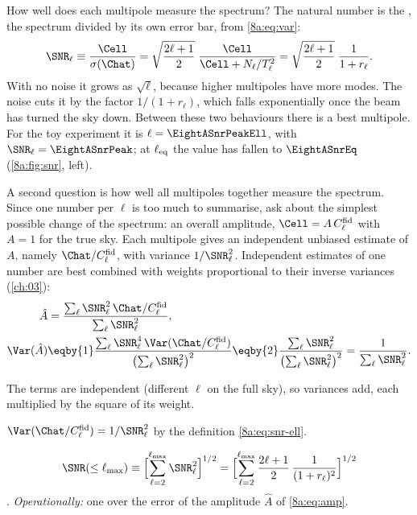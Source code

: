 How well does each multipole measure the spectrum? The natural number is the
, the spectrum divided by its own error bar, from
\eqref{8a:eq:var}:
\begin{equation}
  \SNR_\ell\equiv\frac{\Cell}{\sigma(\Chat)}=\sqrt{\frac{2\ell+1}{2}}\;\frac{\Cell}{\Cell+N_\ell/T_\ell^2}
  =\sqrt{\frac{2\ell+1}{2}}\;\frac{1}{1+r_\ell}.
  \label{8a:eq:snr-ell}
\end{equation}
With no noise it grows as $\sqrt{\ell}$, because higher multipoles have more modes. The noise
cuts it by the factor $1/(1+r_\ell)$, which falls exponentially once the beam has turned the
sky down. Between these two behaviours there is a best multipole. For the toy experiment it is
$\ell=\EightASnrPeakEll$, with $\SNR_\ell=\EightASnrPeak$; at $\ell_{\rm eq}$ the value has fallen
to $\EightASnrEq$ (\cref{8a:fig:snr}, left).

A second question is how well all multipoles together measure the spectrum. Since one
number per $\ell$ is too much to summarise, ask about the simplest possible change of the
spectrum: an overall amplitude, $\Cell=A\,C^{\rm fid}_\ell$ with $A=1$ for the true sky. Each
multipole gives an independent unbiased estimate of $A$, namely $\Chat/C^{\rm fid}_\ell$, with
variance $1/\SNR_\ell^2$. Independent estimates of one number are best combined with weights
proportional to their inverse variances (\cref{ch:03}):
\begin{align}
  \hat A&=\frac{\sum_\ell\SNR_\ell^2\,\Chat/C^{\rm fid}_\ell}{\sum_\ell\SNR_\ell^2},
  \nonumber\\
  \Var(\hat A)
  &\eqby{1}\frac{\sum_\ell\SNR_\ell^4\,\Var(\Chat/C^{\rm fid}_\ell)}{\bigl(\sum_\ell\SNR_\ell^2\bigr)^2}
   \eqby{2}\frac{\sum_\ell\SNR_\ell^2}{\bigl(\sum_\ell\SNR_\ell^2\bigr)^2}
   =\frac{1}{\sum_\ell\SNR_\ell^2} .
  \label{8a:eq:amp}
\end{align}
\begin{explain}
  \item The terms are independent (different $\ell$ on the full sky), so variances add, each
        multiplied by the square of its weight.
  \item $\Var(\Chat/C^{\rm fid}_\ell)=1/\SNR_\ell^2$ by the definition \eqref{8a:eq:snr-ell}.
\end{explain}

\begin{workdef}
\[
  \SNR(\le\ell_{\max})\equiv\Bigl[\sum_{\ell=2}^{\ell_{\max}}\SNR_\ell^2\Bigr]^{1/2}
  =\Bigl[\sum_{\ell=2}^{\ell_{\max}}\frac{2\ell+1}{2}\,\frac{1}{(1+r_\ell)^2}\Bigr]^{1/2}
\]
. \emph{Operationally:} one over the error
of the amplitude $\hat A$ of \eqref{8a:eq:amp}.
\end{workdef}


